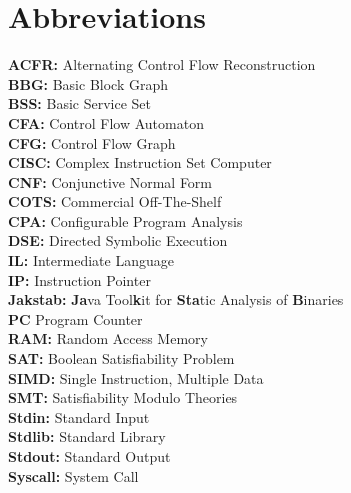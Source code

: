\documentclass{kththesis}
\begin{document}
\section*{Abbreviations}
\thispagestyle{empty}
\textbf{ACFR:} Alternating Control Flow Reconstruction\\
\textbf{BBG:} Basic Block Graph\\
\textbf{BSS:} Basic Service Set\\
\textbf{CFA:} Control Flow Automaton\\
\textbf{CFG:} Control Flow Graph\\
\textbf{CISC:} Complex Instruction Set Computer\\
\textbf{CNF:} Conjunctive Normal Form\\
\textbf{COTS:} Commercial Off-The-Shelf\\
\textbf{CPA:} Configurable Program Analysis \\
\textbf{DSE:} Directed Symbolic Execution\\
\textbf{IL:} Intermediate Language\\
\textbf{IP:} Instruction Pointer\\
\textbf{Jakstab:} \textbf{Ja}va Tool\textbf{k}it for \textbf{Sta}tic Analysis of \textbf{B}inaries\\
\textbf{PC} Program Counter\\
\textbf{RAM:} Random Access Memory\\
\textbf{SAT:} Boolean Satisfiability Problem\\
\textbf{SIMD:} Single Instruction, Multiple Data\\
\textbf{SMT:} Satisfiability Modulo Theories\\
\textbf{Stdin:} Standard Input\\
\textbf{Stdlib:} Standard Library\\
\textbf{Stdout:} Standard Output\\
\textbf{Syscall:} System Call\\

\clearpage
\end{document}
